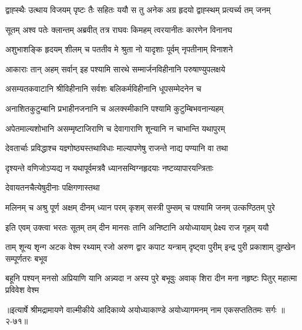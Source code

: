 \twolineshloka
{द्वाह्स्थैः उत्थाय विजयम् पृष्टः तैः सहितः ययौ}
{स तु अनेक अग्र हृदयो द्वाह्स्थम् प्रत्यर्च्य तम् जनम्} %

\twolineshloka
{सूतम् अश्व पतेः क्लान्तम् अब्रवीत् तत्र राघवः}
{किमहम् त्वरयानीतः कारणेन विनानघ} %

\twolineshloka
{अशुभाशङ्कि हृदयम् शीलम् च पततीव मे}
{श्रुता नो यादृशाः पूर्वम् नृपतीनाम् विनाशने} %

\twolineshloka
{आकाराः तान् अहम् सर्वान् इह पश्यामि सारथे}
{सम्मार्जनविहीनानि परुषाण्युपलक्षये} %

\twolineshloka
{असम्यतकवाटानि श्रीविहीनानि सर्वशः}
{बलिकर्मविहीनानि धूपसम्मेदनेन च} %

\twolineshloka
{अनाशितकुटुम्बानि प्रभाहीनजनानि च}
{अलक्स्मीकानि पश्यामि कुटुम्बिभवनान्यहम्} %

\twolineshloka
{अपेतमाल्यशोभानि असम्मृष्टाजिराणि च}
{देवागाराणि शून्यानि न चाभान्ति यथापुरम्} %

\twolineshloka
{देवतार्चाः प्रविद्धाश्च यज्ञ्गोष्ठ्यस्तथाविधाः}
{माल्यापणेषु राजन्ते नाद्य पण्यानि वा तथा} %

\twolineshloka
{दृश्यन्ते वणिजोऽप्यद्य न यथापूर्वमत्रवै}
{ध्यानसम्विग्नहृदयाः नष्टव्यापारयन्त्रिताः} %

\onelineshloka
{देवायतनचैत्येषुदीनाः पक्षिगणास्तथा} %

\twolineshloka
{मलिनम् च अश्रु पूर्ण अक्षम् दीनम् ध्यान परम् कृशम्}
{सस्त्री पुम्सम् च पश्यामि जनम् उत्कण्ठितम् पुरे} %

\twolineshloka
{इति एवम् उक्त्वा भरतः सूतम् तम् दीन मानसः}
{तानि अनिष्टानि अयोध्यायाम् प्रेक्ष्य राज गृहम् ययौ} %

\fourlineindentedshloka
{ताम् शून्य शृन्ग अटक वेश्म रथ्याम्}
{रजो अरुण द्वार कपाट यन्त्राम्}
{दृष्ट्वा पुरीम् इन्द्र पुरी प्रकाशाम्}
{दुह्खेन सम्पूर्णतरः बभूव} %

\fourlineindentedshloka
{बहूनि पश्यन् मनसो अप्रियाणि}
{यानि अन्न्यदा न अस्य पुरे बभूवुः}
{अवाक् शिरा दीन मना नहृष्टः}
{पितुर् महात्मा प्रविवेश वेश्म} %


॥इत्यार्षे श्रीमद्रामायणे वाल्मीकीये आदिकाव्ये अयोध्याकाण्डे अयोध्यागमनम् नाम एकसप्ततितमः सर्गः ॥२-७१॥
